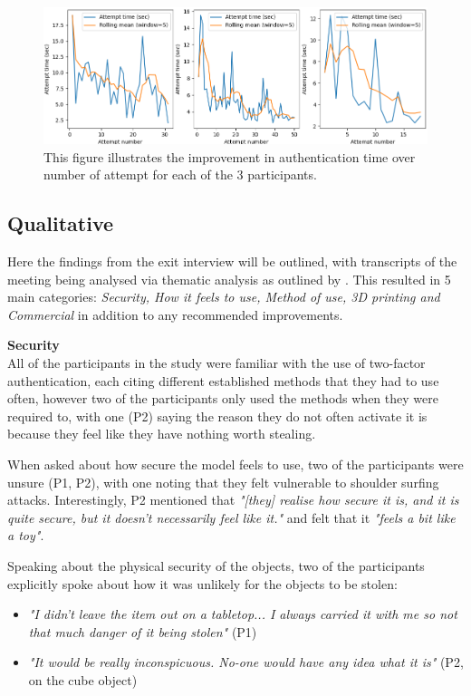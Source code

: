 \documentclass{l4proj}
\begin{document}
\begin{figure}
    \centering
    \includegraphics[width=\linewidth]{images/timetaken_with_rolling_mean.png}
    \caption{This figure illustrates the improvement in authentication time over number of attempt for each of the 3 participants.}
    \label{fig:time_taken}
\end{figure}

\subsection{Qualitative}

Here the findings from the exit interview will be outlined, with transcripts of the meeting being analysed via thematic analysis as outlined by \cite{braun2012thematic}. This resulted in 5 main categories: \textit{Security, How it feels to use, Method of use, 3D printing and Commercial} in addition to any recommended improvements.

\textbf{Security}\\
All of the participants in the study were familiar with the use of two-factor authentication, each citing different established methods that they had to use often, however two of the participants only used the methods when they were required to, with one (P2) saying the reason they do not often activate it is because they feel like they have nothing worth stealing.

When asked about how secure the model feels to use, two of the participants were unsure (P1, P2), with one noting that they felt vulnerable to shoulder surfing attacks. Interestingly, P2 mentioned that \textit{"[they] realise how secure it is, and it is quite secure, but it doesn't necessarily feel like it."} and felt that it \textit{"feels a bit like a toy"}.

Speaking about the physical security of the objects, two of the participants explicitly spoke about how it was unlikely for the objects to be stolen:
\begin{itemize}
    \item \textit{"I didn't leave the item out on a tabletop... I always carried it with me so not that much danger of it being stolen"} (P1)
    \item \textit{"It would be really inconspicuous. No-one would have any idea what it is"} (P2, on the cube object)
\end{itemize}
\end{document}
